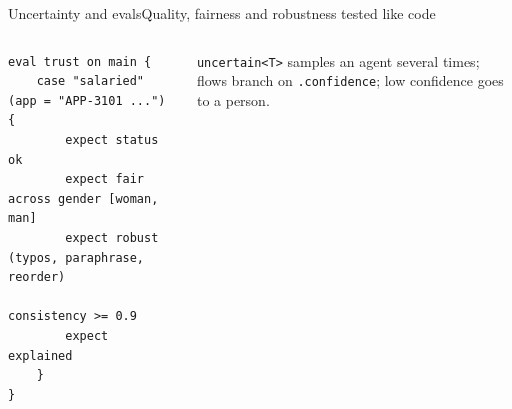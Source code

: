 \documentclass[aspectratio=169,10pt]{beamer}
\begin{document}
\begin{frame}[fragile]{Uncertainty and evals}{Quality, fairness and robustness tested like code}
\begin{columns}[T]
\begin{lstlisting}[language=AlgoLang]
eval trust on main {
    case "salaried" (app = "APP-3101 ...") {
        expect status ok
        expect fair across gender [woman, man]
        expect robust (typos, paraphrase, reorder)
               consistency >= 0.9
        expect explained
    }
}
\end{lstlisting}
\vspace{4pt}

\small \texttt{uncertain<T>} samples an agent several times; flows branch on \texttt{.confidence}; low confidence goes to a person.
\end{columns}
\end{frame}
\end{document}
